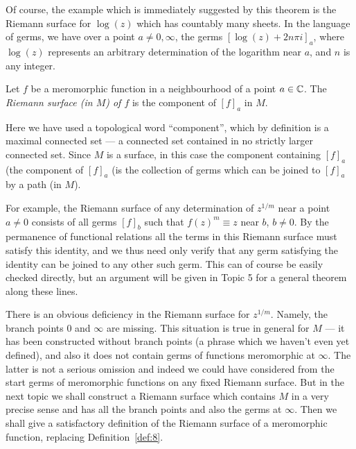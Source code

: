 \documentclass[a4paper,11pt]{article}
\newcounter{topic}
\begin{document}
Of course, the example which is immediately suggested by this theorem
is the Riemann surface for $\log(z)$ which has countably many sheets.
In the language of germs, we have over a point $a \ne 0, \infty$, the
germs $[\log(z) + 2n\pi i]_a$, where $\log(z)$ represents an arbitrary
determination of the logarithm near $a$, and $n$ is any integer.

\begin{defn}
  \label{def:8}
  Let $f$ be a meromorphic function in a neighbourhood of a point $a
  \in {\mathbb C}$.  The \emph{Riemann surface (in $M$) of $f$} is the
  component of $[f]_a$ in $M$.
\end{defn}

Here we have used a topological word ``component'', which by
definition is a maximal connected set --- a connected set contained in
no strictly larger connected set.  Since $M$ is a surface, in this
case the component containing $[f]_a$ (the component of $[f]_a$ (is
the collection of germs which can be joined to $[f]_a$ by a path (in
$M$).

For example, the Riemann surface of any determination of $z^{1/m}$
near a point $a \ne 0$ consists of all germs $[f]_b$ such that $f(z)^m
\equiv z$ near $b$, $b\ne 0$.  By the permanence of functional
relations all the terms in this Riemann surface must satisfy this
identity, and we thus need only verify that any germ satisfying the
identity can be joined to any other such germ.  This can of course be
easily checked directly, but an argument will be given in Topic 5
for a general theorem along these lines.

There is an obvious deficiency in the Riemann surface for $z^{1/m}$.
Namely, the branch points 0 and $\infty$ are missing.  This situation
is true in general for $M$ --- it has been constructed without branch
points (a phrase which we haven't even yet defined), and also it does
not contain germs of functions meromorphic at $\infty$.  The latter is
not a serious omission and indeed we could have considered from the
start germs of meromorphic functions on any fixed Riemann surface.
But in the next topic we shall construct a Riemann surface which
contains $M$ in a very precise sense and has all the branch points and
also the germs at $\infty$.  Then we shall give a satisfactory
definition of the Riemann surface of a meromorphic function, replacing
Definition~\ref{def:8}. 
\end{document}
